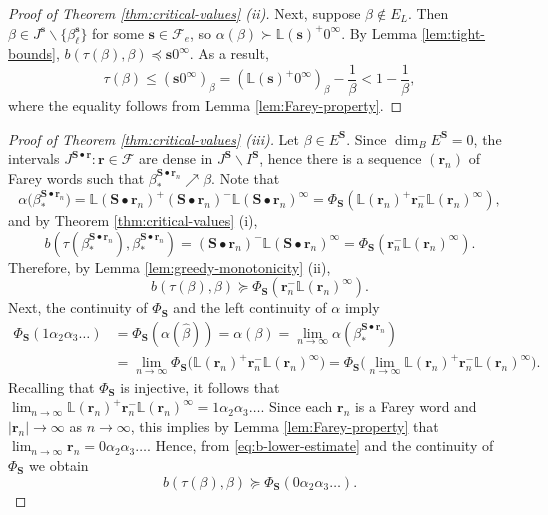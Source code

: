 \documentclass[12pt]{amsart}
\theoremstyle{definition}
\theoremstyle{remark}
\numberwithin{equation}{section}
\renewcommand{\L}{\ensuremath{\mathbb{L}}}
\newcommand{\cF}{\mathcal{F}}
\newcommand{\s}{ {\mathbf{s}}}
\newcommand{\cs}{ {\mathbf{S}}}
\renewcommand{\r}{ {\mathbf{r}}}
\newcommand{\f}{\infty}
\newcommand{\al}{\alpha}
\newcommand{\lle}{\preccurlyeq}
\newcommand{\lge}{\succcurlyeq}
\begin{document}
{\begin{proof}[Proof of Theorem \ref{thm:critical-values} (ii)]
Next, suppose $\beta\not\in E_L$. Then $\beta\in J^\s\backslash\{\beta_\ell^\s\}$ for some $\s\in \cF_e$, so $\al(\beta)\succ \L(\s)^+0^\f$. By Lemma \ref{lem:tight-bounds}, $b(\tau(\beta),\beta)\lle \s 0^\f$. As a result,
\[
\tau(\beta)\leq (\s 0^\f)_\beta=(\L(\s)^+ 0^\f)_\beta-\frac{1}{\beta}<1-\frac{1}{\beta},
\]
where the equality follows from Lemma \ref{lem:Farey-property}.
\end{proof}


\begin{proof}[Proof of Theorem \ref{thm:critical-values} (iii)]
Let $\beta\in E^\cs$. Since $\dim_B E^\cs=0$, the intervals $J^{\cs\bullet \r}: \r\in\cF$ are dense in $J^\cs\backslash I^\cs$, hence there is a sequence $(\r_n)$ of Farey words such that $\beta_*^{\cs\bullet\r_n}\nearrow\beta$. Note that
\[
\al\big(\beta_*^{\cs\bullet\r_n}\big)=\L(\cs\bullet\r_n)^+(\cs\bullet\r_n)^-\L(\cs\bullet\r_n)^\f=\Phi_\cs\left(\L(\r_n)^+\r_n^-\L(\r_n)^\f\right),
\]
and by Theorem \ref{thm:critical-values} (i),
\[
b\left(\tau(\beta_*^{\cs\bullet\r_n}),\beta_*^{\cs\bullet\r_n}\right)=(\cs\bullet\r_n)^-\L(\cs\bullet\r_n)^\f=\Phi_\cs(\r_n^-\L(\r_n)^\f).
\]
Therefore, by Lemma \ref{lem:greedy-monotonicity} (ii),
\begin{equation} \label{eq:b-lower-estimate}
b(\tau(\beta),\beta)\lge \Phi_\cs(\r_n^-\L(\r_n)^\f).
\end{equation}
Next, the continuity of $\Phi_\cs$ and the left continuity of $\alpha$ imply
\begin{align*}
\Phi_\cs(1\al_2\al_3\dots)&=\Phi_\cs(\al(\hat{\beta}))=\al(\beta)=\lim_{n\to\f}\al(\beta_*^{\cs\bullet\r_n})\\
&=\lim_{n\to\f}\Phi_\cs\big(\L(\r_n)^+\r_n^-\L(\r_n)^\f\big)=\Phi_\cs\big(\lim_{n\to\f}\L(\r_n)^+\r_n^-\L(\r_n)^\f\big).
\end{align*}
Recalling that $\Phi_\cs$ is injective, it follows that $\lim_{n\to\f}\L(\r_n)^+\r_n^-\L(\r_n)^\f=1\al_2\al_3\dots$. Since each $\r_n$ is a Farey word and $|\r_n|\to\f$ as $n\to\f$, this implies by Lemma \ref{lem:Farey-property} that $\lim_{n\to\f}\r_n=0\al_2\al_3\dots$. Hence, from \eqref{eq:b-lower-estimate} and the continuity of $\Phi_\cs$ we obtain
\begin{equation} \label{eq:b-lower-inequality}
b(\tau(\beta),\beta)\lge \Phi_\cs(0\al_2\al_3\dots).
\end{equation}


\end{proof}}
\end{document}

